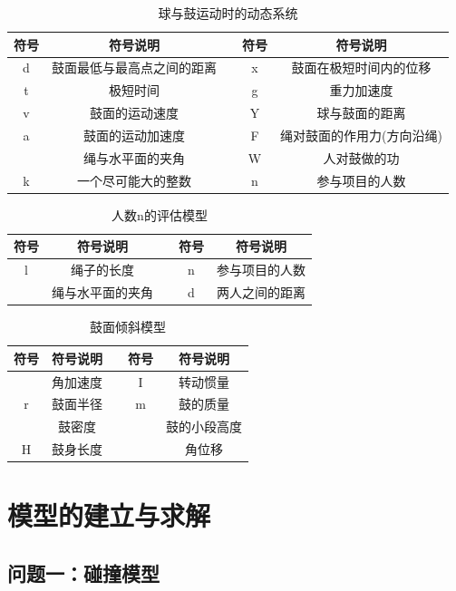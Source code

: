 \documentclass[withoutpreface,bwprint]{cumcmthesis}
\begin{document}
\begin{table}[H]
	\centering
	\caption{球与鼓运动时的动态系统}
	\begin{tabular}{ c c c c c}
	\hline
	 符号 & 符号说明 & & 符号 & 符号说明\\ 
	\hline
	 d & 鼓面最低与最高点之间的距离 &  & \Delta x & 鼓面在极短时间内的位移\\  
	 \Delta t & 极短时间 & & g & 重力加速度\\ 
	 v & 鼓面的运动速度 & & Y & 球与鼓面的距离\\
	 a & 鼓面的运动加速度 & & F & 绳对鼓面的作用力(方向沿绳)\\
	 \theta & 绳与水平面的夹角 & & W & 人对鼓做的功\\
	 k & 一个尽可能大的整数 & & n & 参与项目的人数\\
	\hline
	\end{tabular}
\end{table}

\begin{table}[H]
	\centering
	\caption{人数n的评估模型}
	\begin{tabular}{ c c c c c}
	\hline
	 符号 & 符号说明 & & 符号 & 符号说明\\ 
	\hline
	 l & 绳子的长度 &  & n & 参与项目的人数\\  
	 \theta & 绳与水平面的夹角 & & d & 两人之间的距离\\
	\hline
	\end{tabular}
\end{table}

\begin{table}[H]
	\centering
	\caption{鼓面倾斜模型}
	\begin{tabular}{ c c c c c}
	\hline
	 符号 & 符号说明 & & 符号 & 符号说明\\ 
	\hline
	\beta & 角加速度&  & I & 转动惯量\\  
	 r & 鼓面半径 & & m & 鼓的质量\\
	\rho & 鼓密度 & & \Delta{h} & 鼓的小段高度\\
	 H & 鼓身长度 & & \alpha & 角位移\\
	\hline
	\end{tabular}
\end{table}

\section{模型的建立与求解}
\subsection{问题一：碰撞模型}
\end{document}
